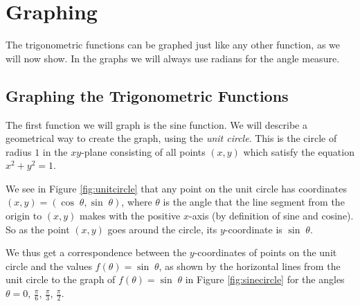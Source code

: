 \chapter{Graphing}
The trigonometric functions can be graphed just like any other function, as we will now show.
In the graphs we will always use radians for the angle measure.

\section{Graphing the Trigonometric Functions}
\piccaption[]{\label{fig:unitcircle}}
The first function we will graph is the sine function. We will describe a geometrical way to
create the graph, using the \emph{unit circle}. This is the
circle of radius $1$ in the $xy$-plane consisting of all points $(x,y)$ which satisfy the equation
$x^2 + y^2 = 1$.

We see in Figure \ref{fig:unitcircle} that any point on the unit circle has coordinates
$(x,y)=(\cos\;\theta,\sin\;\theta)$, where $\theta$ is the angle that the line segment from the
origin to $(x,y)$ makes with the positive $x$-axis (by definition of sine and cosine).
So as the point $(x,y)$ goes around the circle, its $y$-coordinate is $\sin\;\theta$.

We thus get a correspondence between the $y$-coordinates of points on the unit circle and the
values $f(\theta)=\sin\;\theta$, as shown by the horizontal lines from the unit circle to the graph
of $f(\theta)=\sin\;\theta$ in Figure \ref{fig:sinecircle} for the angles $\theta = 0$,
$\tfrac{\pi}{6}$, $\tfrac{\pi}{3}$, $\tfrac{\pi}{2}$.

